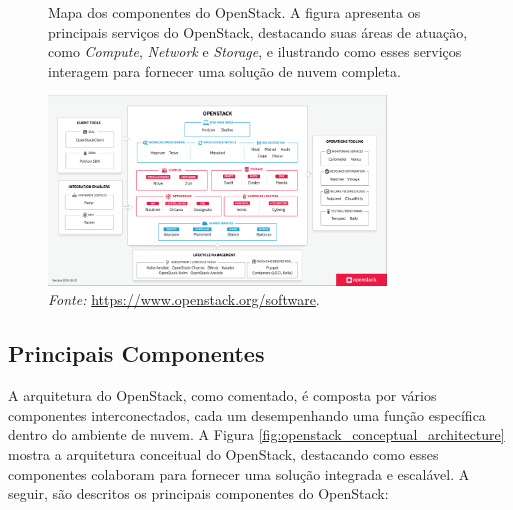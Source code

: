\begin{figure}[htbp]
    \centering
    \caption{Mapa dos componentes do OpenStack. A figura apresenta os principais serviços do OpenStack, destacando suas áreas de atuação, como \textit{Compute}, \textit{Network} e \textit{Storage}, e ilustrando como esses serviços interagem para fornecer uma solução de nuvem completa.}
    \includegraphics[width=0.8\textwidth]{images/map_openstack.png}
    \caption*{\textit{Fonte:} \url{https://www.openstack.org/software}.}
    \label{fig:map_openstack}
\end{figure}


\subsection{Principais Componentes}

A arquitetura do OpenStack, como comentado, é composta por vários componentes interconectados, cada um desempenhando uma função específica dentro do ambiente de nuvem. A Figura \ref{fig:openstack_conceptual_architecture} mostra a arquitetura conceitual do OpenStack, destacando como esses componentes colaboram para fornecer uma solução integrada e escalável. A seguir, são descritos os principais componentes do OpenStack:

